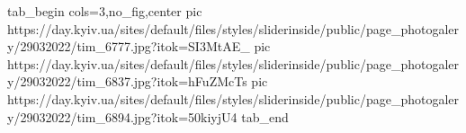  
 
 
 
 

\ifcmt
  tab_begin cols=3,no_fig,center
     pic https://day.kyiv.ua/sites/default/files/styles/sliderinside/public/page_photogalery/29032022/tim_6777.jpg?itok=SI3MtAE_
     pic https://day.kyiv.ua/sites/default/files/styles/sliderinside/public/page_photogalery/29032022/tim_6837.jpg?itok=hFuZMcTs
     pic https://day.kyiv.ua/sites/default/files/styles/sliderinside/public/page_photogalery/29032022/tim_6894.jpg?itok=50kiyjU4
  tab_end
\fi
